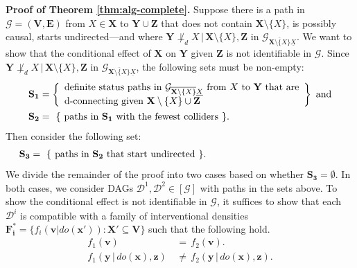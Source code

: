 \documentclass[11pt]{article}
\newcommand{\mb}[1]{\mathbf{#1}}
\newcommand{\dsepp}{\perp_{d}}
\newcommand{\g}[1][G]{\mathcal{#1}}
\newenvironment{proofofnoqed}[1][]{\noindent \textbf{Proof of #1.}}{}
\begin{document}
\begin{proofofnoqed}[Theorem \ref{thm:alg-complete}]
    Suppose there is a path in $\g = (\mb{V, E})$ from $X \in \mb{X}$ to $\mb{Y} \cup \mb{Z}$ that does not contain $\mb{X} \setminus \{X\}$, is possibly causal, starts undirected---and where $\mb{Y} \not\dsepp X \,|\, \mb{X} \setminus \{X\}, \mb{Z}$ in $\g_{\overline{\mb{X} \setminus \{X\}} \underline{X}}$. We want to show that the conditional effect of $\mb{X}$ on $\mb{Y}$ given $\mb{Z}$ is not identifiable in $\g$. Since ${\mb{Y} \not\dsepp X \,|\, \mb{X} \setminus \{X\}, \mb{Z}}$ in $\g_{\overline{\mb{X} \setminus \{X\}} \underline{X}}$, the following sets must be non-empty:
    \begin{align*}
        \mb{S_1} &= \left\{\begin{array}{ll}
                        \text{definite status paths in $\g_{\overline{\mb{X} \setminus \{X\}} \underline{X}}$ from $X$ to $\mb{Y}$ that are} \\
                        \text{d-connecting given $\mb{X} \setminus \{X\} \cup \mb{Z}$}
                    \end{array}\right\} \text{ and}\\
        \mb{S_2} &= \hspace{.05in}\{ \hspace{.05in}\text{paths in $\mb{S_1}$ with the fewest colliders} \hspace{.05in}\}.
    \end{align*}
    Then consider the following set:
    \begin{align*}
        \mb{S_3} &= \hspace{.05in}\{ \hspace{.05in}\text{paths in } \mb{S_2} \text{ that start undirected}\hspace{.05in}\}. \hspace{1.8in}
    \end{align*}
    We divide the remainder of the proof into two cases based on whether $\mb{S_3} = \emptyset$. In both cases, we consider DAGs $\g[D]^1, \g[D]^2 \in [\g]$ with paths in the sets above. To show the conditional effect is not identifiable in $\g$, it suffices to show that each $\g[D]^i$ is compatible with a family of interventional densities $\mb{F^*_i} = \{ f_i(\mb{v}|do(\mb{x'})) : \mb{X'} \subseteq \mb{V} \}$ such that the following hold.
    \begin{align}
        f_1(\mb{v}) &\,=\, f_2(\mb{v}). \label{thm:alg-complete-1}\\
        f_1(\mb{y} \,|\, do(\mb{x}), \mb{z}) & \,\neq\, f_2(\mb{y} \,|\, do(\mb{x}), \mb{z}). \label{thm:alg-complete-2}
    \end{align}


\end{proofofnoqed}
\end{document}

